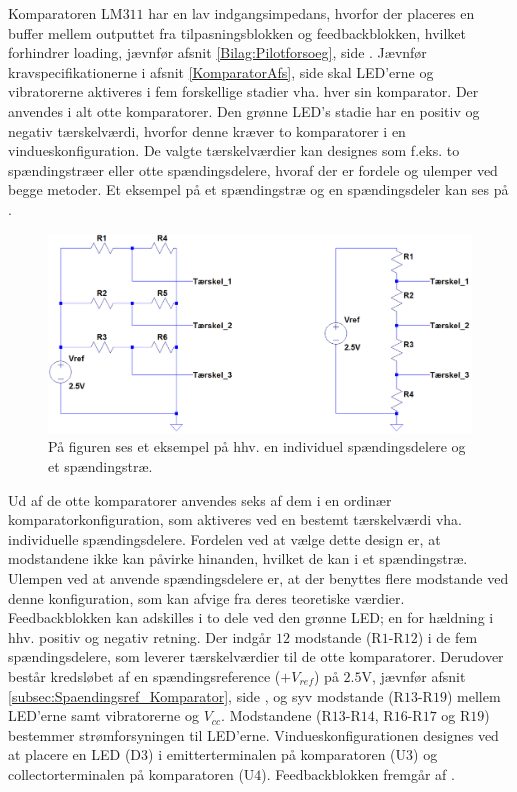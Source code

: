 \noindent Komparatoren LM$311$ har en lav indgangsimpedans, hvorfor der placeres en buffer mellem outputtet fra tilpasningsblokken og feedbackblokken, hvilket forhindrer loading, jævnfør afsnit \ref{Bilag:Pilotforsoeg}, side \pageref{Bilag:Pilotforsoeg} \cite{Instruments2015}. Jævnfør kravspecifikationerne i afsnit \ref{KomparatorAfs}, side \pageref{KomparatorAfs} skal LED'erne og vibratorerne aktiveres i fem forskellige stadier vha. hver sin komparator. Der anvendes i alt otte komparatorer. Den grønne LED's stadie har en positiv og negativ tærskelværdi, hvorfor denne kræver to komparatorer i en vindueskonfiguration. De valgte tærskelværdier kan designes som f.eks. to spændingstræer eller otte spændingsdelere, hvoraf der er fordele og ulemper ved begge metoder. Et eksempel på et spændingstræ og en spændingsdeler kan ses på . 
\begin{figure}[H] 
	\centering
	\includegraphics[scale=0.4]{figures/cProblemloesning/eksempel_speadingstrae.PNG}
	\caption{På figuren ses et eksempel på hhv. en individuel spændingsdelere og et spændingstræ.}
	\label{fig:spaendingstrae}
\end{figure}
\noindent Ud af de otte komparatorer anvendes seks af dem i en ordinær komparatorkonfiguration, som aktiveres ved en bestemt tærskelværdi vha. individuelle spændingsdelere. Fordelen ved at vælge dette design er, at modstandene ikke kan påvirke hinanden, hvilket de kan i et spændingstræ. Ulempen ved at anvende spændingsdelere er, at der benyttes flere modstande ved denne konfiguration, som kan afvige fra deres teoretiske værdier.\\
Feedbackblokken kan adskilles i to dele ved den grønne LED; en for hældning i hhv. positiv og negativ retning. Der indgår $12$ modstande (R$1$-R$12$) i de fem spændingsdelere, som leverer tærskelværdier til de otte komparatorer. Derudover består kredsløbet af en spændingsreference ($+V_{ref}$) på $2.5$V, jævnfør afsnit \ref{subsec:Spaendingsref_Komparator}, side \pageref{subsec:Spaendingsref_Komparator}, og syv modstande (R$13$-R$19$) mellem LED'erne samt vibratorerne og $V_{cc}$. Modstandene (R$13$-R$14$, R$16$-R$17$ og R$19$) bestemmer strømforsyningen til LED'erne. Vindueskonfigurationen designes ved at placere en LED (D$3$) i emitterterminalen på komparatoren (U$3$) og collectorterminalen på komparatoren (U$4$). Feedbackblokken fremgår af . 

